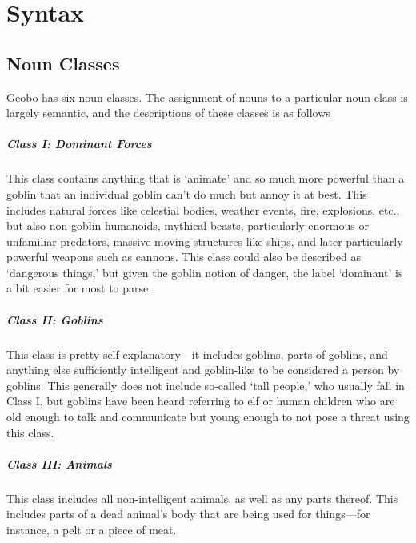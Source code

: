 \documentclass[a4paper,11pt,oneside,openany]{memoir}
\begin{document}
\chapter{Syntax}

\section{Noun Classes}

Geobo{\engma} has six noun classes. The assignment of nouns to a particular noun class is largely semantic, and the descriptions of these classes is as follows

\paragraph{Class I: Dominant Forces}

This class contains anything that is `animate' and so much more powerful than a goblin that an individual goblin can't do much but annoy it at best. This includes natural forces like celestial bodies, weather events, fire, explosions, etc., but also non-goblin humanoids, mythical beasts, particularly enormous or unfamiliar predators, massive moving structures like ships, and later particularly powerful weapons such as cannons. This class could also be described as `dangerous things,' but given the goblin notion of danger, the label `dominant' is a bit easier for most to parse

\paragraph{Class II: Goblins}

This class is pretty self-explanatory---it includes goblins, parts of goblins, and anything else sufficiently intelligent and goblin-like to be considered a person by goblins. This generally does not include so-called `tall people,' who usually fall in Class I, but goblins have been heard referring to elf or human children who are old enough to talk and communicate but young enough to not pose a threat using this class.

\paragraph{Class III: Animals}

This class includes all non-intelligent animals, as well as any parts thereof. This includes parts of a dead animal's body that are being used for things---for instance, a pelt or a piece of meat.
\end{document}
